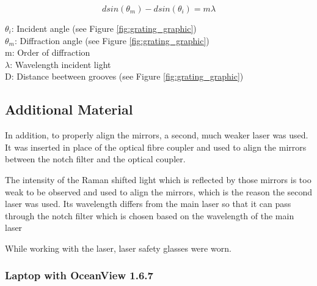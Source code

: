 \begin{equation}
     d sin(\theta_m)-d sin(\theta_i)=m \lambda
 \end{equation}

\(\theta_i\): Incident angle (see Figure \ref{fig:grating_graphic})\\
\(\theta_m\): Diffraction angle (see Figure \ref{fig:grating_graphic})\\
m: Order of diffraction\\
\(\lambda\): Wavelength incident light\\
D: Distance beetween grooves (see Figure \ref{fig:grating_graphic})


\subsection{Additional Material}

In addition, to properly align the mirrors, a second, much weaker laser was used. It was inserted in place of the optical fibre coupler and used to align the mirrors between the notch filter and the optical coupler. 

\bigskip

The intensity of the Raman shifted light which is reflected by those mirrors is too weak to be observed and used to align the mirrors, which is the reason the second laser was used. Its wavelength differs from the main laser so that it can pass through the notch filter which is chosen based on the wavelength of the main laser
\bigskip

While working with the laser, laser safety glasses were worn. 

\subsubsection{Laptop with OceanView 1.6.7}

